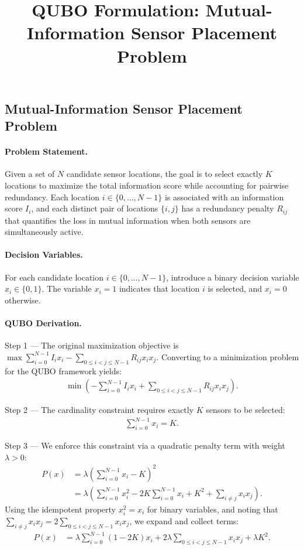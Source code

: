 \documentclass[12pt]{article}
\title{QUBO Formulation: Mutual-Information Sensor Placement Problem}
\date{}
\begin{document}
\maketitle

\subsection*{Mutual-Information Sensor Placement Problem}

\paragraph{Problem Statement.}
Given a set of $N$ candidate sensor locations, the goal is to select exactly $K$ locations to maximize the total information score while accounting for pairwise redundancy. Each location $i \in \{0, \dots, N-1\}$ is associated with an information score $I_i$, and each distinct pair of locations $\{i, j\}$ has a redundancy penalty $R_{ij}$ that quantifies the loss in mutual information when both sensors are simultaneously active.

\paragraph{Decision Variables.}
For each candidate location $i \in \{0, \dots, N-1\}$, introduce a binary decision variable $x_i \in \{0, 1\}$. The variable $x_i = 1$ indicates that location $i$ is selected, and $x_i = 0$ otherwise.

\paragraph{QUBO Derivation.}
Step 1 --- The original maximization objective is $\max \sum_{i=0}^{N-1} I_i x_i - \sum_{0 \le i < j \le N-1} R_{ij} x_i x_j$. Converting to a minimization problem for the QUBO framework yields:
\begin{align}
  \min \left( -\sum_{i=0}^{N-1} I_i x_i + \sum_{0 \le i < j \le N-1} R_{ij} x_i x_j \right).
\end{align}

Step 2 --- The cardinality constraint requires exactly $K$ sensors to be selected:
\begin{align}
  \sum_{i=0}^{N-1} x_i = K.
\end{align}

Step 3 --- We enforce this constraint via a quadratic penalty term with weight $\lambda > 0$:
\begin{align}
  P(x) &= \lambda \left( \sum_{i=0}^{N-1} x_i - K \right)^2 \\
       &= \lambda \left( \sum_{i=0}^{N-1} x_i^2 - 2K \sum_{i=0}^{N-1} x_i + K^2 + \sum_{i \neq j} x_i x_j \right).
\end{align}
Using the idempotent property $x_i^2 = x_i$ for binary variables, and noting that $\sum_{i \neq j} x_i x_j = 2 \sum_{0 \le i < j \le N-1} x_i x_j$, we expand and collect terms:
\begin{align}
  P(x) &= \lambda \sum_{i=0}^{N-1} (1 - 2K) x_i + 2\lambda \sum_{0 \le i < j \le N-1} x_i x_j + \lambda K^2.
\end{align}
\end{document}
